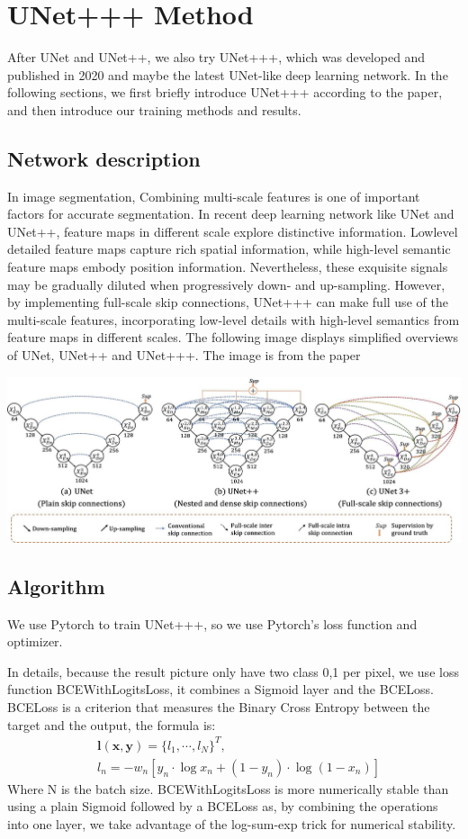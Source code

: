 \section{UNet+++ Method}
After UNet and UNet++, we also try UNet+++,
which was developed and published in 2020 and maybe the latest UNet-like deep learning network.
In the following sections, we first briefly introduce UNet+++ according to the paper, and then introduce our training methods and results.

\subsection{Network description}
In image segmentation, Combining multi-scale features is one of important factors for accurate segmentation.
In recent deep learning network like UNet and UNet++, feature maps in different scale explore distinctive information. Lowlevel detailed feature maps capture rich spatial information, 
while high-level semantic feature maps embody position information. 
Nevertheless, these exquisite signals may be gradually diluted when progressively down- and up-sampling.
However, by implementing full-scale skip connections, UNet+++ can make full use of the multi-scale features, incorporating low-level details with high-level semantics from feature maps in different scales. 
The following image displays simplified overviews of UNet, UNet++ and UNet+++. The image is from the paper

\includegraphics[width=\linewidth]{figuras/UNet+++.jpg}

\subsection{Algorithm}
We use Pytorch to train UNet+++, so we use Pytorch's loss function and optimizer.

In details, because the result picture only have two class 0,1 per pixel, we use loss function BCEWithLogitsLoss, it combines a Sigmoid layer and the BCELoss. 
BCELoss is a criterion that measures the Binary Cross Entropy between the target and the output, the formula is:
\[\begin{aligned}
    &\bm{l}(\bm{x}, \bm{y})=\{l_1, \cdots, l_N\}^T, \\
    &l_n=-w_n[y_n\cdot\log{x_n}+(1-y_n)\cdot\log{(1-x_n)}]
\end{aligned}\]
Where N is the batch size. BCEWithLogitsLoss is more numerically stable than using a plain Sigmoid followed by a BCELoss as, 
by combining the operations into one layer, we take advantage of the log-sum-exp trick for numerical stability.


